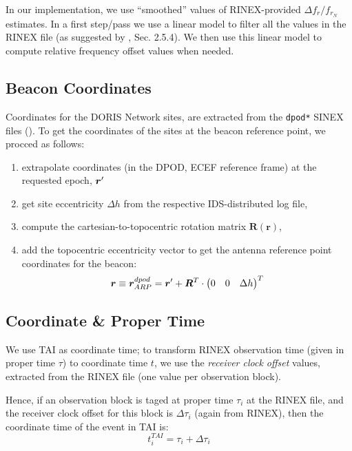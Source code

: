 In our implementation, we use ``smoothed'' values of RINEX-provided 
$\Delta f_r / f_{r_N}$ estimates. In a first step/pass we use a linear model 
to filter all the values in the RINEX file (as suggested by \cite{lemoine-2016}, 
Sec. 2.5.4). We then use this linear model to compute relative frequency offset 
values when needed. 

\subsection{Beacon Coordinates}
\label{ssec:beacon_coordinates}
Coordinates for the DORIS Network sites, are extracted from the \texttt{dpod*} 
SINEX files (\cite{Moreaux2020}). To get the coordinates of the sites at the 
beacon reference point, we procced as follows:
\begin{enumerate}
  \item extrapolate coordinates (in the DPOD, ECEF reference frame) at the 
    requested epoch, $\bm{r}\sp{\prime}$
  \item get site eccentricity $\Delta h$ from the respective IDS-distributed 
    log file,
  \item compute the cartesian-to-topocentric rotation matrix $\bm{R}(\bm{r})$,
  \item add the topocentric eccentricity vector to get the antenna reference
    point coordinates for the beacon:
    \begin{equation}
      \bm{r} \equiv \bm{r}^{dpod}_{ARP} = 
        \bm{r}\sp{\prime} + \bm{R}^T \cdot 
          \begin{pmatrix} 0 & 0 & \Delta h \end{pmatrix}^T
    \end{equation}
\end{enumerate}

\subsection{Coordinate \& Proper Time}
\label{ssec:coordinate-proper-time}
We use TAI as coordinate time; to transform RINEX observation time (given in 
proper time $\tau$) to coordinate time $t$, we use the \emph{receiver clock 
offset} values, extracted from the RINEX file (one value per observation block).

Hence, if an observation block is taged at proper time $\tau _i$ at the RINEX 
file, and the receiver clock offset for this block is $\Delta \tau _i$ (again from 
RINEX), then the coordinate time of the event in TAI is:
\begin{equation}
  t^{TAI}_i = \tau _i + \Delta \tau _i
\end{equation}
